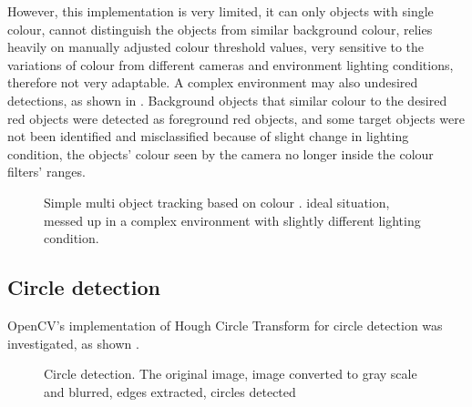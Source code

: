 However, this implementation is very limited, it can only  objects with single colour,  cannot distinguish the objects from similar background colour, relies heavily on manually adjusted colour threshold values, very sensitive to the variations of colour from different cameras and environment lighting conditions, therefore not very adaptable. A complex environment may also  undesired detections, as shown in . Background objects that  similar colour to the desired red objects were detected as foreground red objects, and some target objects were not been identified and misclassified because of  slight change in  lighting condition, the objects' colour seen by the camera  no longer inside the colour filters' ranges.

\begin{figure}[H]
  \centering
  \caption{Simple multi object tracking based on colour \cite{MOTBOC.git}.  ideal situation,  messed up in a complex environment with slightly different lighting condition.}
  \label{imp:MOTBOC}
\end{figure}

\subsection{Circle detection}

OpenCV's implementation of Hough Circle Transform for circle detection was investigated, as shown  .


\begin{figure}[H]
  \centering
  \caption{Circle detection.  The original image,  image converted to gray scale and blurred,  edges extracted,  circles detected}
  \label{Figure:circles}
\end{figure}

